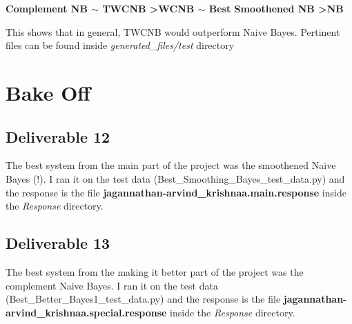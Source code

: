 \documentclass[10pt, letter]{article}
\begin{document}
	\textbf{Complement NB $\sim$ TWCNB \textgreater WCNB $\sim$ Best Smoothened NB \textgreater NB}

This shows that in general, TWCNB would outperform Naive Bayes. Pertinent files can be found inside \textit{generated\_files/test} directory

\section{Bake Off}
\subsection*{Deliverable 12}
The best system from the main part of the project was the smoothened Naive Bayes (!). I ran it on the test data (Best\_Smoothing\_Bayes\_test\_data.py) and the response is the file \textbf{jagannathan-arvind\_krishnaa.main.response} inside the \textit{Response} directory.

\subsection*{Deliverable 13}
The best system from the making it better part of the project was the complement Naive Bayes. I ran it on the test data (Best\_Better\_Bayes1\_test\_data.py) and the response is the file \textbf{jagannathan-arvind\_krishnaa.special.response} inside the \textit{Response} directory.



\end{document}
